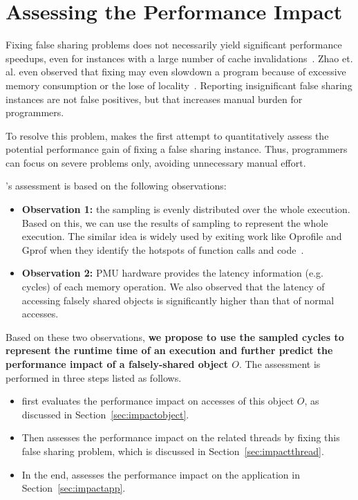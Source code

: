 \section{Assessing the Performance Impact}

\label{sec:predictimprove}
Fixing false sharing problems does not necessarily yield significant performance speedups, even for instances with a large number of cache invalidations~\cite{Sheriff, Predator}. Zhao et. al. even observed that fixing may even slowdown a program because of excessive memory consumption or the lose of locality~\cite{qinzhao}. Reporting insignificant false sharing instances are not false positives, but that increases manual burden for programmers.

To resolve this problem, \cheetah{} makes the first attempt to quantitatively assess the potential performance gain of fixing a false sharing instance. Thus, programmers can focus on severe problems only, avoiding unnecessary manual effort.

\cheetah{}'s assessment is based on the following observations:
\begin{itemize}
\item {\bf Observation 1:} the sampling is evenly distributed over the whole execution. Based on this, we can  use the results of sampling to represent the whole execution. The similar idea is widely used by exiting work like Oprofile and Gprof when they identify the hotspots of function calls and code~\cite{oprofile, DBLP:conf/sigplan/GrahamKM82}.

\item {\bf Observation 2:} PMU hardware provides the latency information (e.g. cycles) of each memory operation. We also observed that the latency of accessing falsely shared objects is significantly higher than that of normal accesses. 

\end{itemize}

Based on these two observations, {\bf we propose to use the sampled cycles to represent the runtime time of an execution and further predict the performance impact of a falsely-shared object $O$}. The assessment is performed in three steps listed as follows. 

\begin{itemize}
\item \cheetah{} first evaluates the performance impact on accesses of this object $O$, as discussed in Section~\ref{sec:impactobject}. 

\item Then \cheetah{} assesses the performance impact on the related threads by fixing this false sharing problem, which is discussed in Section~\ref{sec:impactthread}. 
 
\item In the end, \cheetah{} assesses the performance impact on the application in Section~\ref{sec:impactapp}. 
\end{itemize}


